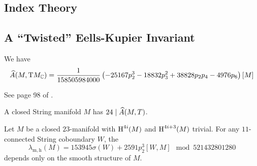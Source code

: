\subsection{Index Theory}

\subsection{A ``Twisted'' Eells-Kupier Invariant}
\begin{definition}
	We have
	\[
		\widehat{A}(M,\mathrm{T} M_{\mathbb{C}}) = \frac{1}{158505984000}\left(-25167p_2^3 - 18832p_3^2 + 38828p_2p_4 - 4976p_6\right)[M]
	\]
\end{definition}
See page 98 of \cite{hopkinsmahowald2002bo8}.


\begin{theorem}
	A closed String manifold $M$ has $24\mid \widehat{A}(M,T)$.
\end{theorem}

\begin{corollary}
	Let $M$ be a closed $23$-manifold with $\operatorname{H}^{4i}(M)$ and $\operatorname{H}^{4i+3}(M)$ trivial. For any $11$-connected String coboundary $W$, the 
	\[
		\lambda_{\mathrm{m,h}}(M) = 153945\sigma(W) + 2591p_2^3[W,M]\mod 521432801280
	\]
	depends only on the smooth structure of $M$.
\end{corollary}
